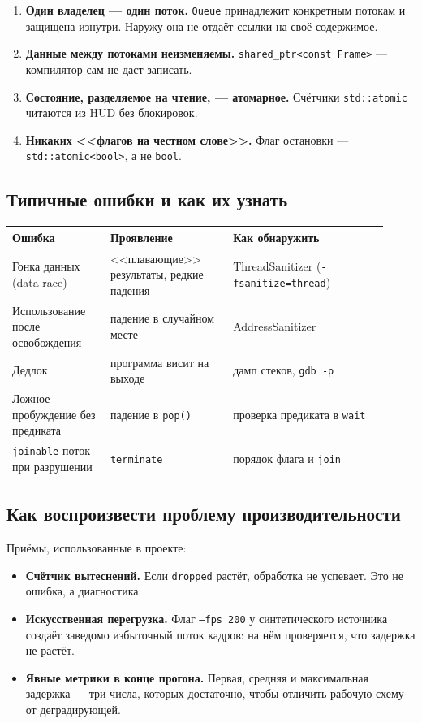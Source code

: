 \documentclass[11pt,a4paper]{article}
\theoremstyle{definition}
\theoremstyle{remark}
\begin{document}
\begin{enumerate}
  \item \textbf{Один владелец --- один поток.} \texttt{Queue} принадлежит
        конкретным потокам и защищена изнутри. Наружу она не отдаёт ссылки на
        своё содержимое.
  \item \textbf{Данные между потоками неизменяемы.}
        \texttt{shared\_ptr<const Frame>} --- компилятор сам не даст записать.
  \item \textbf{Состояние, разделяемое на чтение, --- атомарное.} Счётчики
        \texttt{std::atomic} читаются из HUD без блокировок.
  \item \textbf{Никаких <<флагов на честном слове>>.} Флаг остановки ---
        \texttt{std::atomic<bool>}, а не \texttt{bool}.
\end{enumerate}

\subsection{Типичные ошибки и как их узнать}

\begin{center}
\begin{tabular}{p{0.24\linewidth}p{0.30\linewidth}p{0.38\linewidth}}
\toprule
Ошибка & Проявление & Как обнаружить \\
\midrule
Гонка данных (data race) & <<плавающие>> результаты, редкие падения &
ThreadSanitizer (\texttt{-fsanitize=thread}) \\
Использование после освобождения & падение в случайном месте &
AddressSanitizer \\
Дедлок & программа висит на выходе & дамп стеков, \texttt{gdb -p} \\
Ложное пробуждение без предиката & падение в \texttt{pop()} & проверка
предиката в \texttt{wait} \\
\texttt{joinable} поток при разрушении & \texttt{terminate} & порядок
флага и \texttt{join} \\
\bottomrule
\end{tabular}
\end{center}

\subsection{Как воспроизвести проблему производительности}

Приёмы, использованные в проекте:

\begin{itemize}
  \item \textbf{Счётчик вытеснений.} Если \texttt{dropped} растёт, обработка
        не успевает. Это не ошибка, а диагностика.
  \item \textbf{Искусственная перегрузка.} Флаг
        \texttt{--fps 200} у синтетического источника создаёт заведомо
        избыточный поток кадров: на нём проверяется, что задержка не растёт.
  \item \textbf{Явные метрики в конце прогона.} Первая, средняя и
        максимальная задержка --- три числа, которых достаточно, чтобы
        отличить рабочую схему от деградирующей.
\end{itemize}
\end{document}
